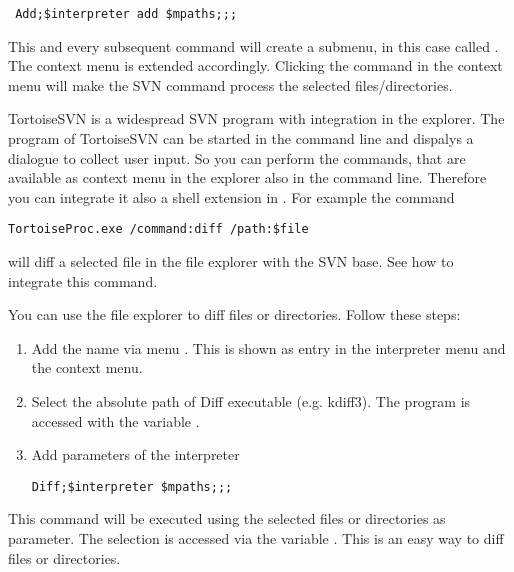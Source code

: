 \begin{lstlisting}
 Add;$interpreter add $mpaths;;;
\end{lstlisting}

This and every subsequent command will create a submenu, in this case called . The context menu is extended accordingly. Clicking the command in the context menu will make the SVN command  process the selected files/directories.

TortoiseSVN is a widespread SVN program with integration in the explorer. The program  of TortoiseSVN can be started in the command line and dispalys a dialogue to collect user input. So you can perform the commands, that are available as context menu in the explorer also in the command line. Therefore you can integrate it also a shell extension in \codeblocks. For example the command

\begin{lstlisting}
TortoiseProc.exe /command:diff /path:$file
\end{lstlisting}

will diff a selected file in the \codeblocks file explorer with the SVN base. See  how to integrate this command.



You can use the file explorer to diff files or directories. Follow these steps:

\begin{enumerate}
\item Add the name via menu . This is shown as entry in the interpreter menu and the context menu.
\item Select the absolute path of Diff executable (e.g. kdiff3). The program is accessed with the variable .
\item Add parameters of the interpreter
\begin{lstlisting}
Diff;$interpreter $mpaths;;;
\end{lstlisting}
\end{enumerate}

This command will be executed using the selected files or directories as parameter. The selection is accessed via the variable . This is an easy way to diff files or directories.

